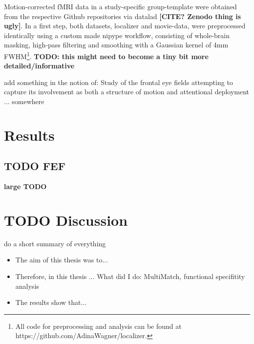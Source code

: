 \documentclass[a4paper, 12pt]{scrreprt}
\begin{document}
Motion-corrected fMRI data in a study-specific group-template were obtained from the respective Github repositories via datalad \textbf{[CITE? Zenodo thing is ugly]}. In a first step, both datasets, localizer and movie-data, were preprocessed identically using a custom made nipype workflow, consisting of whole-brain masking, high-pass filtering and smoothing with a Gaussian kernel of 4mm FWHM\footnote{All code for preprocessing and analysis can be found at https://github.com/AdinaWagner/localizer.}. \newline \textbf{TODO: this might need to become a tiny bit more detailed/informative}




add something in the notion of: Study of the frontal eye fields attempting to capture its involvement as both a structure of motion and attentional deployment ... somewhere


\chapter{Results}\label{section:results}

\bigskip

\section{TODO FEF}\label{section:results_FEF}
\textbf{large TODO}

\chapter{TODO Discussion}\label{section:discussion}
do a short summary of everything

\begin{itemize}
	\item The aim of this thesis was to...
	\item Therefore, in this thesis ... What did I do: MultiMatch, functional specifitity analysis
	\item The results show that...
\end{itemize}
\end{document}
